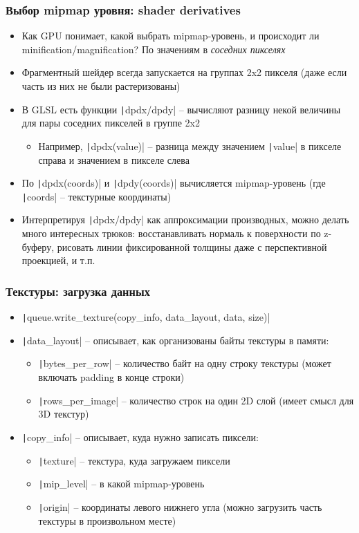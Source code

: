 \documentclass[10pt]{beamer}
\begin{document}
\begin{frame}[fragile]
\frametitle{Выбор mipmap уровня: shader derivatives}
\begin{itemize}
\item Как GPU понимает, какой выбрать mipmap-уровень, и происходит ли minification/magnification? \pause По значениям в \textit{соседних пикселях}
\pause
\item Фрагментный шейдер всегда запускается на группах 2x2 пикселя (даже если часть из них не были растеризованы)
\pause
\item В GLSL есть функции \texttt|dpdx/dpdy| -- вычисляют разницу некой величины для пары соседних пикселей в группе 2x2
\pause
\begin{itemize}
\item Например, \texttt|dpdx(value)| -- разница между значением \texttt|value| в пикселе справа и значением в пикселе слева
\end{itemize}
\pause
\item По \texttt|dpdx(coords)| и \texttt|dpdy(coords)| вычисляется mipmap-уровень (где \texttt|coords| -- текстурные координаты)
\pause
\item Интерпретируя \texttt|dpdx/dpdy| как аппроксимации производных, можно делать много интересных трюков: восстанавливать нормаль к поверхности по z-буферу, рисовать линии фиксированной толщины даже с перспективной проекцией, и т.п.
\end{itemize}
\end{frame}

\begin{frame}[fragile]
\frametitle{Текстуры: загрузка данных}
\begin{itemize}
\item \texttt|queue.write_texture(copy_info, data_layout, data, size)|
\pause
\item \texttt|data_layout| -- описывает, как организованы байты текстуры в памяти:
\pause
\begin{itemize}
\item \texttt|bytes_per_row| -- количество байт на одну строку текстуры (может включать padding в конце строки)
\pause
\item \texttt|rows_per_image| -- количество строк на один 2D слой (имеет смысл для 3D текстур)
\end{itemize}
\pause
\item \texttt|copy_info| -- описывает, куда нужно записать пиксели:
\pause
\begin{itemize}
\item \texttt|texture| -- текстура, куда загружаем пиксели
\pause
\item \texttt|mip_level| -- в какой mipmap-уровень
\pause
\item \texttt|origin| -- координаты левого нижнего угла (можно загрузить часть текстуры в произвольном месте)
\end{itemize}
\end{itemize}
\end{frame}
\end{document}
